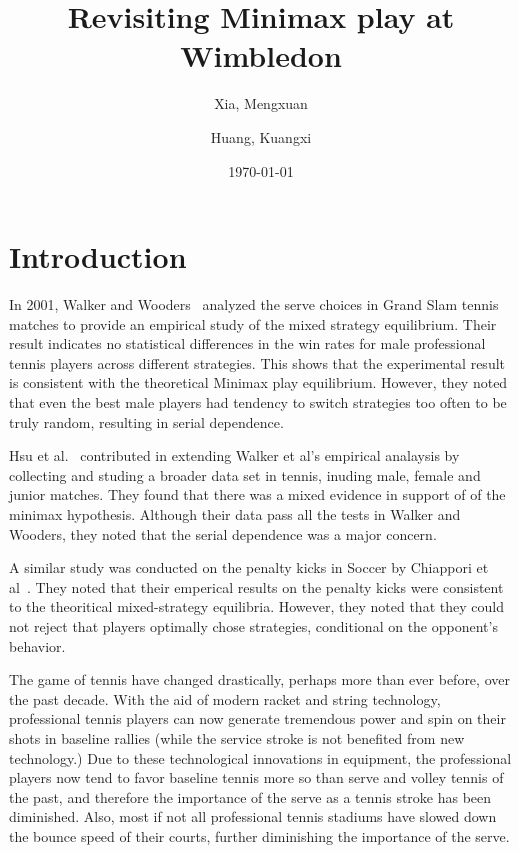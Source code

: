 \documentclass[11pt]{article}
\begin{document}
\title{Revisiting Minimax play at Wimbledon}
\author{
  Xia, Mengxuan
  \and
  Huang, Kuangxi
}
\date{\today}
\maketitle

\listoftodos

\begin{abstract}

\end{abstract}


\section{Introduction}

In 2001, Walker and Wooders~\cite{walker2001minimax} analyzed the serve choices in Grand Slam tennis matches to provide an empirical study of the mixed strategy equilibrium. Their result indicates no statistical differences in the win rates for male professional tennis players across different strategies. This shows that the experimental result is consistent with the theoretical Minimax play equilibrium. However, they noted that even the best male players had tendency to switch strategies too often to be truly random, resulting in serial dependence. 

Hsu et al.~\cite{hsu2007minimax} contributed in extending Walker et al's empirical analaysis by collecting and studing a broader data set in tennis, inuding male, female and junior matches. They found that there was a mixed evidence in support of of the minimax hypothesis. Although their data pass all the tests in Walker and Wooders, they noted that the serial dependence was a major concern. 

A similar study was conducted on the penalty kicks in Soccer by Chiappori et al~\cite{chiappori2002testing}. They noted that their emperical results on the penalty kicks were consistent to the theoritical mixed-strategy equilibria.
However, they noted that they could not reject that players optimally chose strategies, conditional on the opponent's behavior.

The game of tennis have changed drastically, perhaps more than ever before, over the past decade. With the aid of modern racket and string technology, professional tennis players can now generate tremendous power and spin on their shots in baseline rallies (while the service stroke is not benefited from new technology.)  Due to these technological innovations in equipment, the professional players now tend to favor baseline tennis more so than serve and volley tennis of the past, and therefore the importance of the serve as a tennis stroke has been diminished. Also, most if not all professional tennis stadiums have slowed down the bounce speed of their courts, further diminishing the importance of the serve. 
\end{document}
